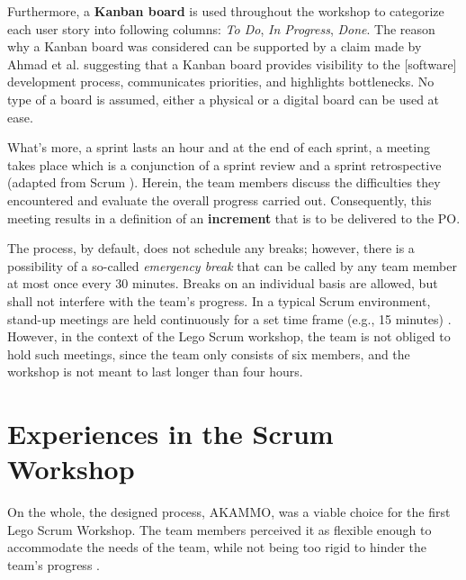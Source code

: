 \documentclass[conference]{IEEEtran}
\begin{document}
Furthermore, a \textbf{Kanban board} is used throughout the workshop to
categorize each user story into following columns: \textit{To Do}, \textit{In
Progress}, \textit{Done}. The reason why a Kanban board was considered can be
supported by a claim made by Ahmad et al. \cite{Ahmad2014} suggesting that a
Kanban board provides visibility to the [software] development process,
communicates priorities, and highlights bottlenecks. No type of a board is
assumed, either a physical or a digital board can be used at ease.

What's more, a sprint lasts an hour and at the end of each sprint, a meeting
takes place which is a conjunction of a sprint review and a sprint
retrospective (adapted from Scrum \cite{Schwaber2020}). Herein, the team
members discuss the difficulties they encountered and evaluate the overall
progress carried out. Consequently, this meeting results in a definition of an
\textbf{increment} that is to be delivered to the PO.

The process, by default, does not schedule any breaks; however, there is a
possibility of a so-called \textit{emergency break} that can be called by any
team member at most once every 30 minutes. Breaks on an individual basis are
allowed, but shall not interfere with the team's progress. In a typical Scrum
environment, stand-up meetings are held continuously for a set time frame
(e.g., 15 minutes) \cite{Schwaber2020}. However, in the context of the Lego
Scrum workshop, the team is not obliged to hold such meetings, since the team
only consists of six members, and the workshop is not meant to last longer than
four hours.

\section{Experiences in the Scrum Workshop}
\label{sec:experiences}


On the whole, the designed process, {\selectfont AKAMMO},
was a viable choice for the first Lego Scrum Workshop. The team members perceived
it as flexible enough to accommodate the needs of the team, while not being too
rigid to hinder the team's progress \cite{DIT348A2}.
\end{document}
